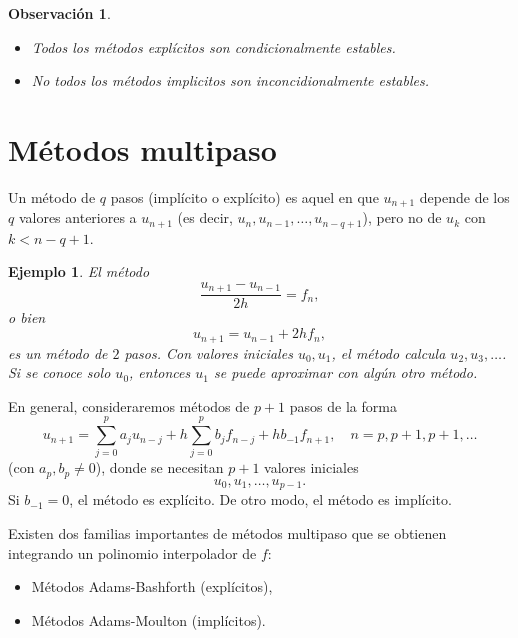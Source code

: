 \documentclass[11pt,letterpaper]{report}
\newtheorem{example}{Ejemplo}
\newtheorem{remark}{Observación}
\begin{document}
\begin{remark}\leavevmode
  \begin{itemize}
    \item
      Todos los métodos explícitos son condicionalmente estables.
    \item
      No todos los métodos implicitos son inconcidionalmente
      estables.
  \end{itemize}
\end{remark}

\section{Métodos multipaso}

Un método de $q$ pasos (implícito o explícito) es aquel en que
$u_{n+1}$ depende de los $q$ valores anteriores a $u_{n+1}$
(es decir, $u_n,u_{n-1},\dots,u_{n-q+1}$), pero no de $u_k$
con $k<n-q+1$.

\begin{example}
  El método
  \begin{equation}
    \frac{ u_{n+1}-u_{n-1} }{2h} = f_n
  ,\end{equation}
  o bien
  \begin{equation}
    u_{n+1} = u_{n-1} + 2hf_n
  ,\end{equation}
  es un método de $2$ pasos. Con valores iniciales $u_0,u_1$, el
  método calcula $u_2,u_3,\dots$. Si se conoce solo $u_0$, entonces
  $u_1$ se puede aproximar con algún otro método.
\end{example}

En general, consideraremos métodos de $p+1$ pasos de la forma
\begin{equation}
  u_{n+1}
  =
  \sum_{j=0}^{p}a_ju_{n-j}
  +h \sum_{j=0}^{p}b_jf_{n-j}
  +hb_{-1}f_{n+1}, \quad n=p,p+1,p+1,\dots
\end{equation}
(con $a_p,b_p\neq 0$), donde se necesitan $p+1$ valores iniciales
\begin{equation}
  u_0,u_1,\dots,u_{p-1}
.\end{equation}
Si $b_{-1}=0$, el método es explícito. De otro modo, el método es
implícito.

Existen dos familias importantes de métodos multipaso
que se obtienen integrando un polinomio interpolador de $f$:
\begin{itemize}
  \item
    Métodos Adams-Bashforth (explícitos),
  \item
    Métodos Adams-Moulton (implícitos).
\end{itemize}
\end{document}
